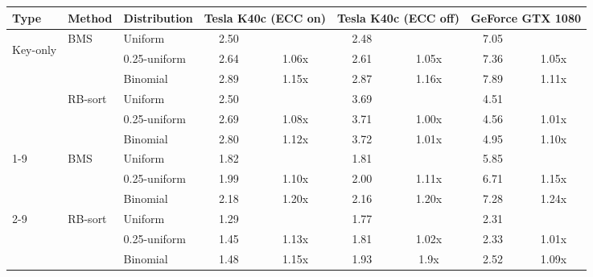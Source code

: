 \begin{table}
\centering
\scriptsize
\begin{tabular}{lll cc | cc | cc}
\toprule
Type & Method & Distribution & \multicolumn{2}{c}{Tesla K40c (ECC on)} & \multicolumn{2}{c}{Tesla K40c (ECC off)} & \multicolumn{2}{c}{GeForce GTX 1080} \\
\midrule
    \multirow{6}{*}{\begin{turn}{90}Key-only\end{turn}}
    & \multirow{3}{*}{BMS}
    & Uniform
        &  2.50 &  & 2.48 &  & 7.05 &   \\
    & & 0.25-uniform
        &   2.64 & 1.06x & 2.61 & 1.05x & 7.36  & 1.05x    \\
    & & Binomial
        &   2.89 & 1.15x & 2.87  & 1.16x & 7.89 & 1.11x    \\
\cmidrule{2-9}
    & \multirow{3}{*}{RB-sort}
    & Uniform
        &  2.50 &  & 3.69 &  & 4.51 &   \\
    & & 0.25-uniform
        &  2.69  & 1.08x  & 3.71  & 1.00x  & 4.56  & 1.01x   \\
    & & Binomial
        &   2.80  & 1.12x  & 3.72  & 1.01x  & 4.95  & 1.10x    \\
\cmidrule{1-9}
\cmidrule{1-9}
\multirow{6}{*}{\begin{turn}{90}Key-value\end{turn}}
    & \multirow{3}{*}{BMS}
    & Uniform
        &  1.82 &  & 1.81 &  & 5.85 &   \\
    & & 0.25-uniform
        &   1.99  & 1.10x & 2.00  & 1.11x  & 6.71  & 1.15x    \\
    & & Binomial
        &   2.18  & 1.20x  & 2.16  & 1.20x  & 7.28 & 1.24x    \\
\cmidrule{2-9}
    & \multirow{3}{*}{RB-sort}
    & Uniform
        & 1.29 & & 1.77 &  & 2.31 &   \\
    & & 0.25-uniform
        &  1.45  & 1.13x  & 1.81  & 1.02x  & 2.33  & 1.01x    \\
    & & Binomial
        &   1.48  & 1.15x   & 1.93  & 1.9x  & 2.52  & 1.09x    \\


\end{tabular}
\end{table}
